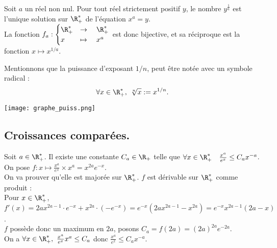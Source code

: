 \documentclass[11pt]{article}
\begin{document}
\begin{prop}{}{}
    Soit $a$ un réel non nul. Pour tout réel strictement positif $y$, le nombre $y^{\frac{1}{a}}$ est l'unique solution sur $\R_+^*$ de l'équation $x^a=y$.\\
    La fonction $f_a:\begin{cases}
        \R_+^*&\to\quad\R_+^*\\
        x&\mapsto\quad x^a
    \end{cases}$ est donc bijective, et sa réciproque est la fonction $x\mapsto x^{1/a}$.
\end{prop}

\begin{nota}{}{}
    Mentionnons que la puissance d'exposant $1/n$, peut être notée avec un symbole radical :
    \begin{equation*}
        \forall x\in\R^*_+,~\sqrt[n]{x}:=x^{1/n}.
    \end{equation*}
\end{nota}

\begin{center}
    \texttt{[image: graphe\_puiss.png]}
\end{center}

\subsection{Croissances comparées.}

\begin{lemme}{}{}
    Soit $a\in\R_+^*$. Il existe une constante $C_a\in\R_+$ telle que $\forall x\in\R_+^*\quad\frac{x^a}{e^x}\leq C_ax^{-a}$.
    \tcblower
    On pose $f:x\mapsto\frac{x^a}{e^x}\times x^a=x^{2a}e^{-x}$.\\
    On va prouver qu'elle est majorée sur $\R_+^*$. $f$ est dérivable sur $\R_+^*$ comme produit :\\
    Pour $x\in\R_+^*$, $f'(x)=2ax^{2a-1}\cdot e^{-x}+x^{2a}\cdot (-e^{-x})=e^{-x}(2ax^{2a-1}-x^{2a})=e^{-x}x^{2a-1}(2a-x)$.\\
    $f$ possède donc un maximum en $2a$, posons $C_a=f(2a)=(2a)^{2a}e^{-2a}$.\\
    On a $\forall x \in \R_+^*,~\frac{x^a}{e^x}x^a\leq C_a$ donc $\frac{x^a}{e^x}\leq C_a x^{-a}$.
\end{lemme}
\end{document}

